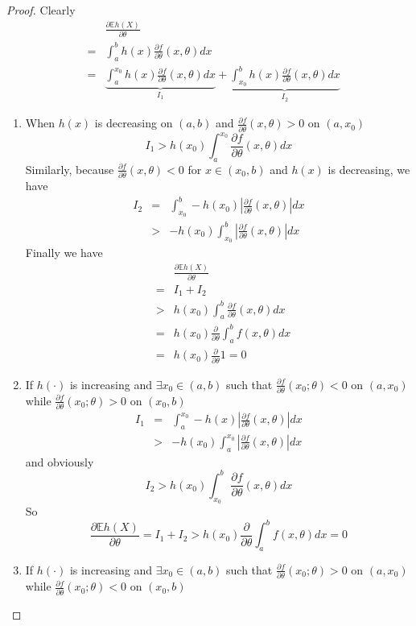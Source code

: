 \documentclass{article}
\newcommand{\pd}[2]{
  \frac{\partial #1}{\partial #2}
}
\newcommand{\opd}[1]{
  \frac{\partial}{\partial #1}
}
\newcommand{\E}{
  \mathbb{E}
}
\newcommand{\1}[1]{
  \mathbf{1}_{\{#1\}}
}
\begin{document}
\begin{proof}
  Clearly
  \begin{eqnarray*}
    && \pd{\E h(X)}{\theta} \\
    &=& \int_a^b h(x) \pd{f}{\theta}(x, \theta) dx \\
    &=& \underbrace{\int_a^{x_0} h(x) \pd{f}{\theta}(x, \theta) dx}_{I_1}
    + \underbrace{\int_{x_0}^b h(x) \pd{f}{\theta}(x, \theta) dx}_{I_2}
  \end{eqnarray*}
  \begin{enumerate}
  \item When $h(x)$ is decreasing on $(a, b)$ and $\pd{f}{\theta}(x,
    \theta) > 0$ on $(a, x_0)$
    \[
    I_1 > h(x_0) \int_a^{x_0} \pd{f}{\theta}(x, \theta) dx
    \]
    Similarly, because $\pd{f}{\theta}(x, \theta) < 0$ for $x \in (x_0, b)$ and
    $h(x)$ is decreasing, we have
    \begin{eqnarray*}
      I_2 &=& \int_{x_0}^b -h(x_0)
      \left|\pd{f}{\theta}(x, \theta) \right| dx \\
      &>& -h(x_0)
      \int_{x_0}^b \left| 
        \pd{f}{\theta}(x, \theta)
      \right| dx
    \end{eqnarray*}
    Finally we have
    \begin{eqnarray*}
      && \pd{\E h(X)}{\theta} \\
      &=& I_1 + I_2 \\
      &>& h(x_0) \int_a^b \pd{f}{\theta}(x, \theta) dx \\
      &=& h(x_0) \opd{\theta} \int_a^b f(x, \theta) dx \\
      &=& h(x_0) \opd{\theta} 1 = 0
    \end{eqnarray*}
  \item If $h(\cdot)$ is increasing and $\exists x_0 \in (a, b)$ such that 
    $\pd{f}{\theta}(x_0; \theta) < 0$ on $(a, x_0)$  while
    $\pd{f}{\theta}(x_0; \theta) > 0$ on $(x_0, b)$
    \begin{eqnarray*}
      I_1 &=&
      \int_a^{x_0} -h(x)
      \left| \pd{f}{\theta}(x, \theta) \right| dx \\
      &>&
      -h(x_0) \int_a^{x_0}
      \left| \pd{f}{\theta}(x, \theta) \right| dx
    \end{eqnarray*}
    and obviously
    \[
    I_2 > h(x_0) \int_{x_0}^b
    \pd{f}{\theta}(x, \theta) dx
    \]
    So
    \[
    \pd{\E h(X)}{\theta}
    = I_1 + I_2
    > h(x_0) \opd{\theta} \int_a^b f(x, \theta) dx = 0
    \]
  \item If $h(\cdot)$ is increasing and $\exists x_0 \in (a, b)$ such that
    $\pd{f}{\theta}(x_0; \theta) > 0$ on $(a, x_0)$ while
    $\pd{f}{\theta}(x_0; \theta) < 0$ on $(x_0, b)$


\end{enumerate}
\end{proof}
\end{document}
